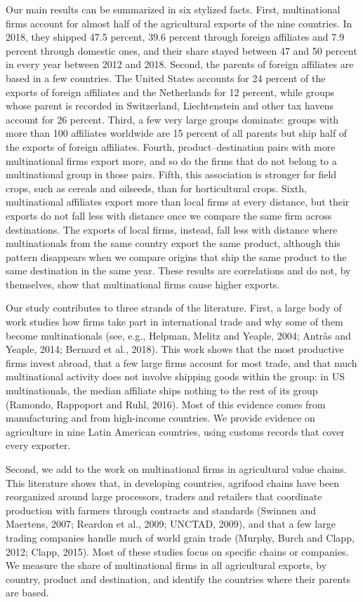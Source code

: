 \documentclass[11pt,a4paper]{article}
\begin{document}
Our main results can be summarized in six stylized facts. First, multinational firms account for almost
half of the agricultural exports of the nine countries. In 2018, they shipped 47.5 percent, 39.6
percent through foreign affiliates and 7.9 percent through domestic ones, and their share stayed
between 47 and 50 percent in every year between 2012 and 2018. Second, the parents of foreign
affiliates are based in a few countries. The United States accounts for 24 percent of the exports
of foreign affiliates and the Netherlands for 12 percent, while groups whose parent is recorded in
Switzerland, Liechtenstein and other tax havens account for 26 percent. Third, a few very large
groups dominate: groups with more than 100 affiliates worldwide are 15 percent of all parents but
ship half of the exports of foreign affiliates. Fourth, product--destination pairs with more
multinational firms export more, and so do the firms that do not belong to a multinational group in
those pairs. Fifth, this association is stronger for field crops, such as cereals and oilseeds, than
for horticultural crops. Sixth, multinational affiliates export more than local firms at every distance, but their exports do not fall less with
distance once we compare the same firm across destinations. The exports of local firms, instead,
fall less with distance where multinationals from the same country export the same product,
although this pattern disappears when we compare origins that ship the same product to the same
destination in the same year. These results are correlations and do not, by themselves, show that
multinational firms cause higher exports.

Our study contributes to three strands of the literature. First, a large body of work studies how
firms take part in international trade and why some of them become multinationals (see, e.g.,
Helpman, Melitz and Yeaple, 2004; Antr\`as and Yeaple, 2014; Bernard et al., 2018). This work shows
that the most productive firms invest abroad, that a few large firms account for most trade, and
that much multinational activity does not involve shipping goods within the group: in US
multinationals, the median affiliate ships nothing to the rest of its group (Ramondo, Rappoport and
Ruhl, 2016). Most of this evidence comes from manufacturing and from high-income countries. We
provide evidence on agriculture in nine Latin American countries, using customs records that cover
every exporter.

Second, we add to the work on multinational firms in agricultural value chains. This literature
shows that, in developing countries, agrifood chains have been reorganized around large
processors, traders and retailers that coordinate production with farmers through contracts and
standards (Swinnen and Maertens, 2007; Reardon et al., 2009; UNCTAD, 2009), and that a few large
trading companies handle much of world grain trade (Murphy, Burch and Clapp, 2012; Clapp, 2015).
Most of these studies focus on specific chains or companies. We measure the share of multinational
firms in all agricultural exports, by country, product and destination, and identify the countries
where their parents are based.
\end{document}
